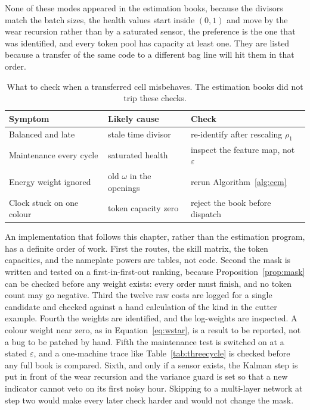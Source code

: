 None of these modes appeared in the estimation books, because the divisors match the batch sizes, the health values start inside \((0,1)\) and move by the wear recursion rather than by a saturated sensor, the preference is the one that was identified, and every token pool has capacity at least one. They are listed because a transfer of the same code to a different bag line will hit them in that order.

\begin{table}[ht]
\centering
\caption{What to check when a transferred cell misbehaves. The estimation books did not trip these checks.}
\label{tab:failmodes}
\small
\begin{tabular}{llp{6.2cm}}
\toprule
Symptom & Likely cause & Check \\
\midrule
Balanced and late & stale time divisor & re-identify after rescaling \(\rho_1\) \\
Maintenance every cycle & saturated health & inspect the feature map, not \(\varepsilon\) \\
Energy weight ignored & old \(\omega\) in the openings & rerun Algorithm~\ref{alg:cem} \\
Clock stuck on one colour & token capacity zero & reject the book before dispatch \\
\bottomrule
\end{tabular}
\end{table}

An implementation that follows this chapter, rather than the estimation program, has a definite order of work. First the routes, the skill matrix, the token capacities, and the nameplate powers are tables, not code. Second the mask is written and tested on a first-in-first-out ranking, because Proposition~\ref{prop:mask} can be checked before any weight exists: every order must finish, and no token count may go negative. Third the twelve raw costs are logged for a single candidate and checked against a hand calculation of the kind in the cutter example. Fourth the weights are identified, and the log-weights are inspected. A colour weight near zero, as in Equation~\eqref{eq:wstar}, is a result to be reported, not a bug to be patched by hand. Fifth the maintenance test is switched on at a stated \(\varepsilon\), and a one-machine trace like Table~\ref{tab:threecycle} is checked before any full book is compared. Sixth, and only if a sensor exists, the Kalman step is put in front of the wear recursion and the variance guard is set so that a new indicator cannot veto on its first noisy hour. Skipping to a multi-layer network at step two would make every later check harder and would not change the mask.

